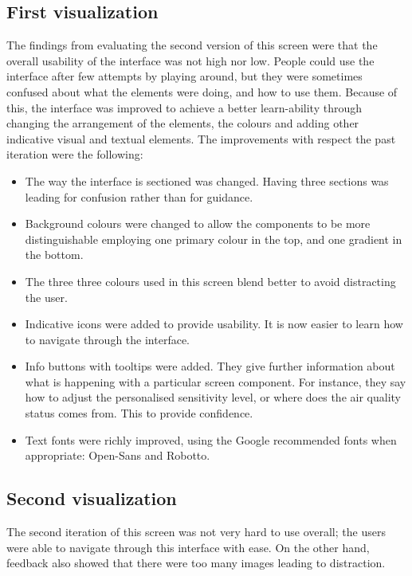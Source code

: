 \subsection{First visualization}
The findings from evaluating the second version of this screen were that the overall usability of the interface was not high nor low. People could use the interface after few attempts by playing around, but they were sometimes confused about what the elements were doing, and how to use them. Because of this, the interface was improved to achieve a better learn-ability through changing the arrangement of the elements, the colours and adding other indicative visual and textual elements.
The improvements with respect the past iteration were the following:
\begin{itemize}
    \item  The way the interface is sectioned was changed. Having three sections was leading for confusion rather than for guidance.
    \item Background colours were changed to allow the components to be more distinguishable employing one primary colour in the top, and one gradient in the bottom.
    \item  The three three colours used in this screen blend better to avoid distracting the user.
    \item Indicative icons were added to provide usability. It is now easier to learn how to navigate through the interface.
    \item Info buttons with tooltips were added. They give further information about what is happening with a particular screen component. For instance, they say how to adjust the personalised sensitivity level, or where does the air quality status comes from. This to provide confidence. 
    \item Text fonts were richly improved, using the Google recommended fonts when appropriate:  Open-Sans and Robotto.
\end{itemize}

\subsection{Second visualization}
The second iteration of this screen was not very hard to use overall; the users were able to navigate through this interface with ease. On the other hand, feedback also showed that there were too many images leading to distraction. 

